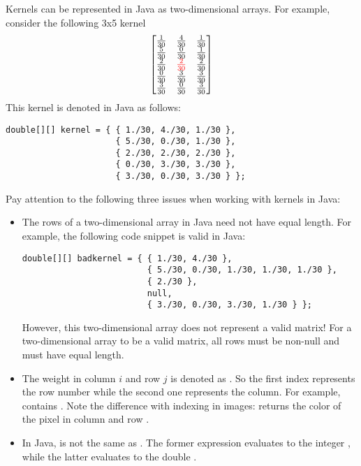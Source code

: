\documentclass{book}
\begin{document}
Kernels can be represented in Java as two-dimensional arrays. For example, consider the following 3x5 kernel 
$$
 \begin{bmatrix}
  \frac{1}{30} & \frac{4}{30} & \frac{1}{30} \\
  \frac{5}{30} & \frac{0}{30} & \frac{1}{30} \\
  \frac{2}{30} & \textcolor{red}{\frac{2}{30}} & \frac{2}{30}\\
  \frac{0}{30} & \frac{3}{30} & \frac{3}{30}\\
  \frac{3}{30} & \frac{0}{30} & \frac{3}{30}\\
 \end{bmatrix}
$$
This kernel is denoted in Java as follows:
\begin{lstlisting}
double[][] kernel = { { 1./30, 4./30, 1./30 },
                      { 5./30, 0./30, 1./30 },
                      { 2./30, 2./30, 2./30 },
                      { 0./30, 3./30, 3./30 },
                      { 3./30, 0./30, 3./30 } };
\end{lstlisting}
Pay attention to the following three issues when working with kernels in Java:
\begin{itemize}
  \item The rows of a two-dimensional array in Java need not have equal length. For example, the following code snippet is valid in Java:
\begin{lstlisting}
double[][] badkernel = { { 1./30, 4./30 },
                         { 5./30, 0./30, 1./30, 1./30, 1./30 },
                         { 2./30 },
                         null,
                         { 3./30, 0./30, 3./30, 1./30 } };
\end{lstlisting}
However, this two-dimensional array does not represent a valid matrix! For a two-dimensional array to be a valid matrix, all rows must be non-null and must have equal length.
  \item The weight in column $i$ and row $j$ is denoted as . So the first index represents the row number while the second one represents the column. For example,  contains . Note the difference with indexing in images:  returns the color of the pixel in column  and row .
  \item In Java,  is not the same as . The former expression evaluates to the integer , while the latter evaluates to the double .
\end{itemize}
\end{document}
